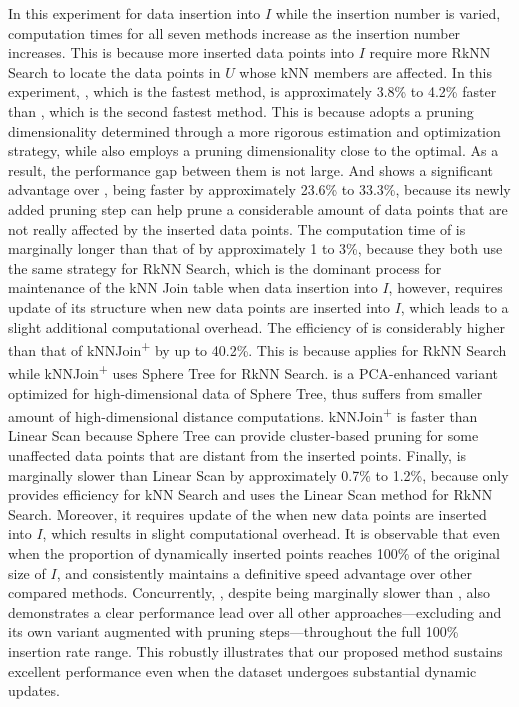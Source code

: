 In this experiment for data insertion into $I$ while the insertion number is varied, computation times for all seven methods increase as the insertion number increases. This is because more inserted data points into $I$ require more RkNN Search to locate the data points in $U$ whose kNN members are affected. In this experiment, \cpdualtree, which is the fastest method, is approximately 3.8\% to 4.2\% faster than \spdualtree, which is the second fastest method. This is because \cpdualtree adopts a pruning dimensionality determined through a more rigorous estimation and optimization strategy, while \spdualtree also employs a pruning dimensionality close to the optimal. As a result, the performance gap between them is not large. And \spdualtree shows a significant advantage over \hdrtree, being faster by approximately 23.6\% to 33.3\%, because its newly added pruning step can help prune a considerable amount of data points that are not really affected by the inserted data points. The computation time of \dualtree is marginally longer than that of \hdrtree by approximately 1 to 3\%, because they both use the same strategy for RkNN Search, which is the dominant process for maintenance of the kNN Join table when data insertion into $I$, however, \dualtree requires update of its \deltatree structure when new data points are inserted into $I$, which leads to a slight additional computational overhead. The efficiency of \dualtree is considerably higher than that of kNNJoin\textsuperscript{+} by up to 40.2\%. This is because \dualtree applies \hdrtree for RkNN Search while kNNJoin\textsuperscript{+} uses Sphere Tree for RkNN Search. \hdrtree is a PCA-enhanced variant optimized for high-dimensional data of Sphere Tree, thus suffers from smaller amount of high-dimensional distance computations. kNNJoin\textsuperscript{+} is faster than Linear Scan because Sphere Tree can provide cluster-based pruning for some unaffected data points that are distant from the inserted points. Finally, \deltatree is marginally slower than Linear Scan by approximately 0.7\% to 1.2\%, because \deltatree only provides efficiency for kNN Search and uses the Linear Scan method for RkNN Search. Moreover, it requires update of the \deltatree when new data points are inserted into $I$, which results in slight computational overhead. It is observable that even when the proportion of dynamically inserted points reaches 100\% of the original size of $I$, \cpdualtree and \spdualtree consistently maintains a definitive speed advantage over other compared methods. Concurrently, \dualtree, despite being marginally slower than \hdrtree, also demonstrates a clear performance lead over all other approaches—excluding \hdrtree and its own variant augmented with pruning steps—throughout the full 100\% insertion rate range. This robustly illustrates that our proposed method sustains excellent performance even when the dataset undergoes substantial dynamic updates.


